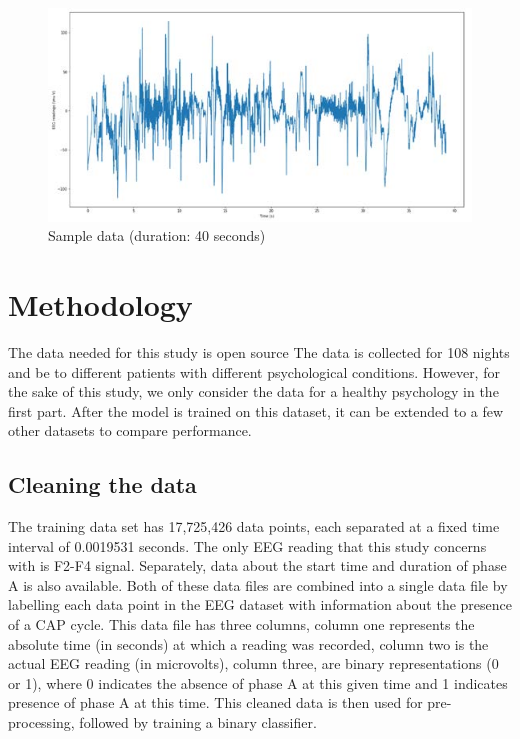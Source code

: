 \documentclass{article}
\begin{document}
\begin{figure}[!t]
\begin{center}
\centerline{\includegraphics[width=\columnwidth]{graph}}
	\caption{{\leg Sample data (duration: 40 seconds)}}
\label{fig:goal-driven-1}
\end{center}
\vskip -0.2in
\end{figure}

\section{Methodology}

The data needed for this study is open source  The data is  collected for 108 nights and be to different patients with different psychological conditions. However, for the sake of this study, we only consider the data for a healthy psychology in the first part. After the model is trained on this dataset, it can be extended to a few other datasets to compare performance.
\subsection{Cleaning the data}



\newcommand{\Agent}{\mathcal{A}}
\newcommand{\MDP}{\mathcal{M}}
\newcommand{\Npast}{N_{\mathrm{past}}}



The training data set has 17,725,426 data points, each separated at a fixed time interval of 0.0019531 seconds. The only EEG reading that this study concerns with is F2-F4 signal. Separately, data about the start time and duration of phase A is also available. Both of these data files are combined into a single data file by labelling each data point in the EEG dataset with information about the presence of a CAP cycle. This data file has three columns, column one represents the absolute time (in seconds) at which a reading was recorded, column two is the actual EEG reading (in microvolts), column three, are binary representations (0 or 1), where 0 indicates the  absence of phase A at this given time and 1 indicates presence of phase A at this time. This cleaned data is then used for pre-processing, followed by training a binary classifier.
\end{document}
